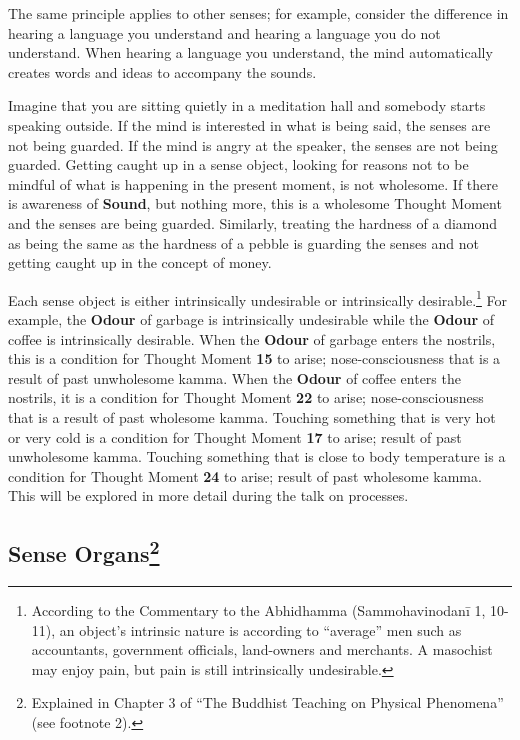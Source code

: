 The same principle applies to other senses; for example, consider the difference in hearing a language you understand and hearing a language you do not understand. When hearing a language you understand, the mind automatically creates words and ideas to accompany the sounds.

Imagine that you are sitting quietly in a meditation hall and somebody starts speaking outside. If the mind is interested in what is being said, the senses are not being guarded. If the mind is angry at the speaker, the senses are not being guarded. Getting caught up in a sense object, looking for reasons not to be mindful of what is happening in the present moment, is not wholesome. If there is awareness of \textbf{Sound}, but nothing more, this is a wholesome Thought Moment and the senses are being guarded. Similarly, treating the hardness of a diamond as being the same as the hardness of a pebble is guarding the senses and not getting caught up in the concept of money.

Each sense object is either intrinsically undesirable or intrinsically desirable.\footnote{According to the Commentary to the Abhidhamma (Sammohavinodanī 1, 10-11), an object’s intrinsic nature is according to “average” men such as accountants, government officials, land-owners and merchants. A masochist may enjoy pain, but pain is still intrinsically undesirable.} For example, the \textbf{Odour} of garbage is intrinsically undesirable while the \textbf{Odour} of coffee is intrinsically desirable. When the \textbf{Odour} of garbage enters the nostrils, this is a condition for Thought Moment \textbf{15} to arise; nose-consciousness that is a result of past unwholesome kamma. When the \textbf{Odour} of coffee enters the nostrils, it is a condition for Thought Moment \textbf{22} to arise; nose-consciousness that is a result of past wholesome kamma. Touching something that is very hot or very cold is a condition for Thought Moment \textbf{17} to arise; result of past unwholesome kamma. Touching something that is close to body temperature is a condition for Thought Moment \textbf{24} to arise; result of past wholesome kamma. This will be explored in more detail during the talk on processes.

\subsection*{Sense Organs\footnote{Explained in Chapter 3 of “The Buddhist Teaching on Physical Phenomena” (see footnote 2).}}

